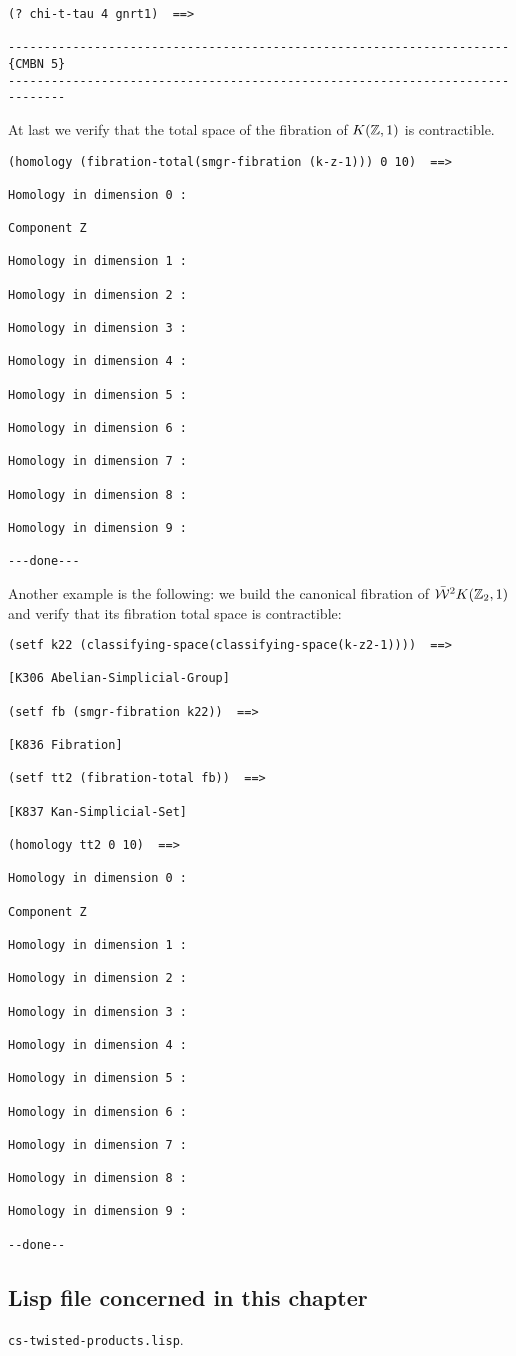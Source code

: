 \newpage
{\footnotesize\begin{verbatim}
(? chi-t-tau 4 gnrt1)  ==>

----------------------------------------------------------------------{CMBN 5}
------------------------------------------------------------------------------
\end{verbatim}}
At last we verify that the total space of the fibration of $K({\mathbb{Z}},1)$ is
contractible.
{\footnotesize\begin{verbatim}
(homology (fibration-total(smgr-fibration (k-z-1))) 0 10)  ==>

Homology in dimension 0 :

Component Z

Homology in dimension 1 :

Homology in dimension 2 :

Homology in dimension 3 :

Homology in dimension 4 :

Homology in dimension 5 :

Homology in dimension 6 :

Homology in dimension 7 :

Homology in dimension 8 :

Homology in dimension 9 :

---done---
\end{verbatim}}
Another example is the following:
we build the canonical fibration of $\bar{\cal W}^2K({{\mathbb{Z}}_2}, 1)$ and verify
that its fibration total  space is contractible:
{\footnotesize\begin{verbatim}
(setf k22 (classifying-space(classifying-space(k-z2-1))))  ==>

[K306 Abelian-Simplicial-Group]

(setf fb (smgr-fibration k22))  ==>

[K836 Fibration]

(setf tt2 (fibration-total fb))  ==>

[K837 Kan-Simplicial-Set]

(homology tt2 0 10)  ==>

Homology in dimension 0 :

Component Z

Homology in dimension 1 :

Homology in dimension 2 :

Homology in dimension 3 :

Homology in dimension 4 :

Homology in dimension 5 :

Homology in dimension 6 :

Homology in dimension 7 :

Homology in dimension 8 :

Homology in dimension 9 :

--done--
\end{verbatim}}

\subsection* {Lisp file concerned in this chapter}

{\tt cs-twisted-products.lisp}.

